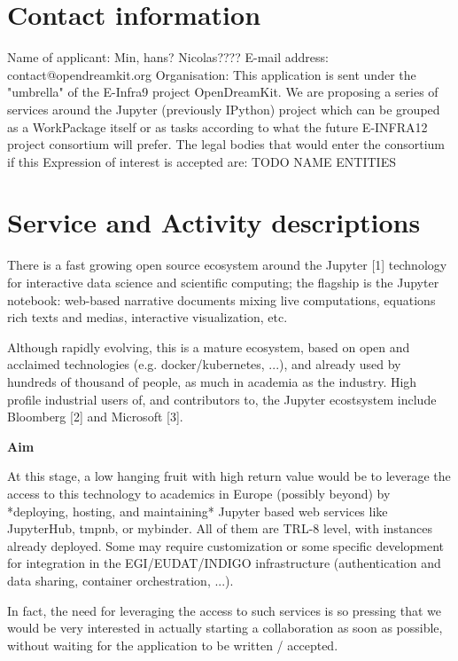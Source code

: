 \section{Contact information}

Name of applicant: Min, hans? Nicolas????
E-mail address: contact@opendreamkit.org
Organisation: This application is sent under the "umbrella" of the E-Infra9
project OpenDreamKit. We are proposing a series of services around the
Jupyter (previously IPython) project which can be grouped as a WorkPackage itself or as
tasks according to what the future E-INFRA12 project consortium will
prefer. The legal bodies that would enter the consortium if this Expression
of interest is accepted are: TODO NAME ENTITIES

\section{Service and Activity descriptions}

There is a fast growing open source ecosystem around the Jupyter [1]
technology for interactive data science and scientific computing; the
flagship is the Jupyter notebook: web-based narrative documents mixing
live computations, equations rich texts and medias, interactive
visualization, etc.

Although rapidly evolving, this is a mature ecosystem, based on open
and acclaimed technologies (e.g. docker/kubernetes, ...), and already
used by hundreds of thousand of people, as much in academia as the
industry. High profile industrial users of, and contributors to, the Jupyter ecostsystem include Bloomberg [2] and Microsoft [3].

\textbf{Aim}

At this stage, a low hanging fruit with high return value would be to
leverage the access to this technology to academics in Europe
(possibly beyond) by *deploying, hosting, and maintaining* Jupyter
based web services like JupyterHub, tmpnb, or mybinder. All of them
are TRL-8 level, with instances already deployed. Some may require
customization or some specific development for integration in the
EGI/EUDAT/INDIGO infrastructure (authentication and data sharing,
container orchestration, ...).

In fact, the need for leveraging the access to such services is so
pressing that we would be very interested in actually starting a
collaboration as soon as possible, without waiting for the application
to be written / accepted.

